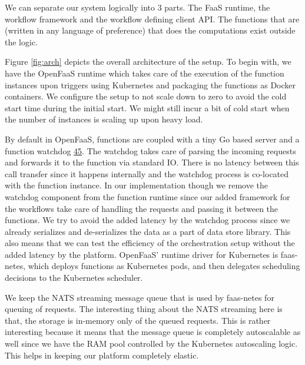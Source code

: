 \documentclass[12pt,titlepage]{article}
\begin{document}
We can separate our system logically into 3 parts. The FaaS runtime, the
workflow framework and the workflow defining client API. The functions that are
(written in any language of preference) that does the computations exist outside the
logic.

Figure \ref{fig:arch} depicts the overall architecture of the setup. To begin
with, we have the OpenFaaS runtime which takes care of the execution of the
function instances upon triggers using Kubernetes and packaging the functions as
Docker containers. We configure the setup to not scale down to zero to avoid the
cold start time during the initial start. We might still incur a bit of cold start
when the number of instances is scaling up upon heavy load.

By default in OpenFaaS, functions are coupled with a tiny Go based server and a
function watchdog \hyperref[ref:45]{45}. The watchdog takes care of parsing the incoming requests
and forwards it to the function via standard IO. There is no latency between
this call transfer since it happens internally and the watchdog process is
co-located with the function instance. In our implementation though we remove
the watchdog component from the function runtime since our added framework for
the workflows take care of handling the requests and passing it between the
functions. We try to avoid the added latency by the watchdog process since we
already serializes and de-serializes the data as a part of data store library.
This also means that we can test the efficiency of the orchestration setup
without the added latency by the platform. OpenFaaS’ runtime driver for
Kubernetes is faas-netes, which deploys functions as Kubernetes pods, and then
delegates scheduling decisions to the Kubernetes scheduler. 

We keep the NATS streaming message queue that is used by faas-netes for queuing
of requests. The interesting thing about the NATS streaming here is that, the
storage is in-memory only of the queued requests. This is rather interesting
because it means that the message queue is completely autoscalable as well since
we have the RAM pool controlled by the Kubernetes autoscaling logic. This helps
in keeping our platform completely elastic. 
\end{document}
